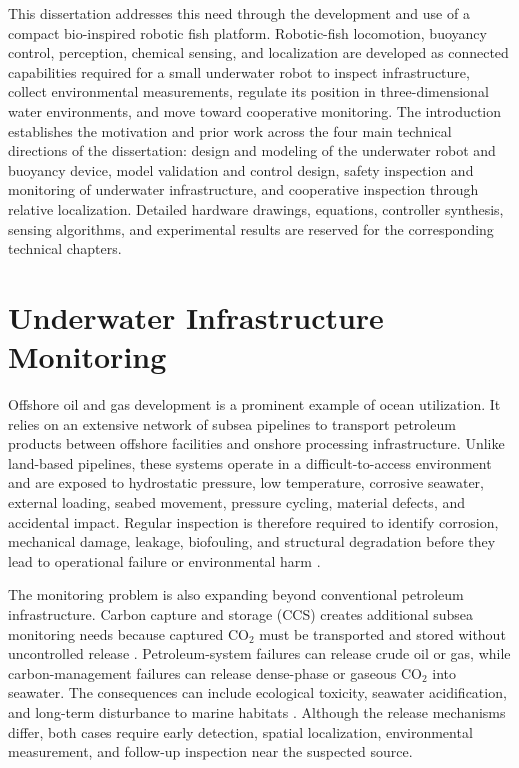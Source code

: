 \documentclass{uhcoethesis}
\begin{document}
This dissertation addresses this need through the development and use of a compact bio-inspired robotic fish platform. Robotic-fish locomotion, buoyancy control, perception, chemical sensing, and localization are developed as connected capabilities required for a small underwater robot to inspect infrastructure, collect environmental measurements, regulate its position in three-dimensional water environments, and move toward cooperative monitoring. The introduction establishes the motivation and prior work across the four main technical directions of the dissertation: design and modeling of the underwater robot and buoyancy device, model validation and control design, safety inspection and monitoring of underwater infrastructure, and cooperative inspection through relative localization. Detailed hardware drawings, equations, controller synthesis, sensing algorithms, and experimental results are reserved for the corresponding technical chapters.

\section{Underwater Infrastructure Monitoring}

Offshore oil and gas development is a prominent example of ocean utilization. It relies on an extensive network of subsea pipelines to transport petroleum products between offshore facilities and onshore processing infrastructure. Unlike land-based pipelines, these systems operate in a difficult-to-access environment and are exposed to hydrostatic pressure, low temperature, corrosive seawater, external loading, seabed movement, pressure cycling, material defects, and accidental impact. Regular inspection is therefore required to identify corrosion, mechanical damage, leakage, biofouling, and structural degradation before they lead to operational failure or environmental harm \cite{Ho2020,Shukla2016,Mcleod2012,Patel2024}.

The monitoring problem is also expanding beyond conventional petroleum infrastructure. Carbon capture and storage (CCS) creates additional subsea monitoring needs because captured \mbox{CO$_2$} must be transported and stored without uncontrolled release \cite{Herzog2001,Yadav2022,Osman2021}. Petroleum-system failures can release crude oil or gas, while carbon-management failures can release dense-phase or gaseous \mbox{CO$_2$} into seawater. The consequences can include ecological toxicity, seawater acidification, and long-term disturbance to marine habitats \cite{Filonchyk2024,Kabir2023,Zheng2021,Mortezaei2021,Queiros2014,Pham2016}. Although the release mechanisms differ, both cases require early detection, spatial localization, environmental measurement, and follow-up inspection near the suspected source.
\end{document}
